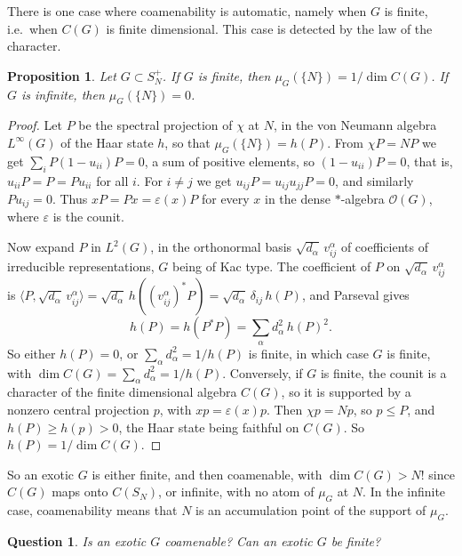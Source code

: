\documentclass[11pt]{amsart}
\newtheorem{proposition}[theorem]{Proposition}
\newtheorem{question}[theorem]{Question}
\theoremstyle{definition}
\theoremstyle{remark}
\theoremstyle{plain}
\numberwithin{equation}{section}
\numberwithin{table}{section}
\begin{document}
There is one case where coamenability is automatic, namely when $G$ is finite, i.e.\ when $C(G)$ is finite dimensional. This case is detected by the law of the character.

\begin{proposition}\label{prop:atom}
Let $G\subset S_N^+$. If $G$ is finite, then $\mu_G(\{N\})=1/\dim C(G)$. If $G$ is infinite, then $\mu_G(\{N\})=0$.
\end{proposition}

\begin{proof}
Let $P$ be the spectral projection of $\chi$ at $N$, in the von Neumann algebra $L^\infty(G)$ of the Haar state $h$, so that $\mu_G(\{N\})=h(P)$. From $\chi P=NP$ we get $\sum_iP(1-u_{ii})P=0$, a sum of positive elements, so $(1-u_{ii})P=0$, that is, $u_{ii}P=P=Pu_{ii}$ for all $i$. For $i\ne j$ we get $u_{ij}P=u_{ij}u_{jj}P=0$, and similarly $Pu_{ij}=0$. Thus $xP=Px=\varepsilon(x)P$ for every $x$ in the dense $*$-algebra $\mathcal O(G)$, where $\varepsilon$ is the counit.

Now expand $P$ in $L^2(G)$, in the orthonormal basis $\sqrt{d_\alpha}\,v^\alpha_{ij}$ of coefficients of irreducible representations, $G$ being of Kac type. The coefficient of $P$ on $\sqrt{d_\alpha}\,v^\alpha_{ij}$ is $\langle P,\sqrt{d_\alpha}\,v^\alpha_{ij}\rangle=\sqrt{d_\alpha}\,h((v^\alpha_{ij})^*P)=\sqrt{d_\alpha}\,\delta_{ij}\,h(P)$, and Parseval gives
\[
h(P)=h(P^*P)=\sum_\alpha d_\alpha^2\,h(P)^2.
\]
So either $h(P)=0$, or $\sum_\alpha d_\alpha^2=1/h(P)$ is finite, in which case $G$ is finite, with $\dim C(G)=\sum_\alpha d_\alpha^2=1/h(P)$. Conversely, if $G$ is finite, the counit is a character of the finite dimensional algebra $C(G)$, so it is supported by a nonzero central projection $p$, with $xp=\varepsilon(x)p$. Then $\chi p=Np$, so $p\le P$, and $h(P)\ge h(p)>0$, the Haar state being faithful on $C(G)$. So $h(P)=1/\dim C(G)$.
\end{proof}

So an exotic $G$ is either finite, and then coamenable, with $\dim C(G)>N!$ since $C(G)$ maps onto $C(S_N)$, or infinite, with no atom of $\mu_G$ at $N$. In the infinite case, coamenability means that $N$ is an accumulation point of the support of $\mu_G$.

\begin{question}\label{qu:coam}
Is an exotic $G$ coamenable? Can an exotic $G$ be finite?
\end{question}
\end{document}
